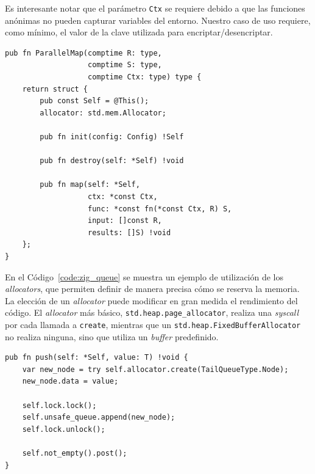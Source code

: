 \documentclass[11pt]{article}
\newcommand{\english}[1]{\textit{#1}}
\begin{document}
Es interesante notar que el parámetro \lstinline{Ctx} se requiere debido a que las funciones anónimas no pueden capturar variables del entorno. Nuestro caso de uso requiere, como mínimo, el valor de la clave utilizada para encriptar/desencriptar.

\begin{listing}[h]
\begin{verbatim}
pub fn ParallelMap(comptime R: type,
                   comptime S: type,
                   comptime Ctx: type) type {
    return struct {
        pub const Self = @This();
        allocator: std.mem.Allocator;

        pub fn init(config: Config) !Self

        pub fn destroy(self: *Self) !void

        pub fn map(self: *Self,
                   ctx: *const Ctx,
                   func: *const fn(*const Ctx, R) S,
                   input: []const R,
                   results: []S) !void
    };
}
\end{verbatim}
\caption{Definición abreviada del \lstinline{ParallelMap} en Zig}
\label{code:zig_parallel_map}
\end{listing}

En el Código~\ref{code:zig_queue} se muestra un ejemplo de utilización de los \english{allocators}, que permiten definir de manera precisa cómo se reserva la memoria. La elección de un \english{allocator} puede modificar en gran medida el rendimiento del código. El \english{allocator} más básico, \lstinline{std.heap.page_allocator}, realiza una \english{syscall} por cada llamada a \lstinline{create}, mientras que un \lstinline{std.heap.FixedBufferAllocator} no realiza ninguna, sino que utiliza un \english{buffer} predefinido.

\begin{listing}[h]
\begin{verbatim}
pub fn push(self: *Self, value: T) !void {
    var new_node = try self.allocator.create(TailQueueType.Node);
    new_node.data = value;

    self.lock.lock();
    self.unsafe_queue.append(new_node);
    self.lock.unlock();

    self.not_empty().post();
}
\end{verbatim}
\caption{Implementación del metodo \lstinline{push} de la \english{Queue} \english{thread-safe} en Zig}
\label{code:zig_queue}
\end{listing}
\end{document}
